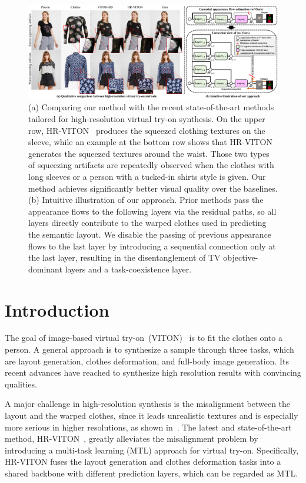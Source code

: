 \documentclass[letterpaper]{article} %
\begin{document}
\begin{figure}[t!]
    \centering
     \includegraphics[width=\linewidth]{fig/fig1.pdf}
     \caption{
     (a) Comparing our method with the recent state-of-the-art methods tailored for high-resolution virtual try-on synthesis. On the upper row, HR-VITON~\cite{lee2022hrviton} produces the squeezed clothing textures on the sleeve, while an example at the bottom row shows that HR-VITON generates the squeezed textures around the waist. Those two types of squeezing artifacts are repeatedly observed when the clothes with long sleeves or a person with a tucked-in shirts style is given. Our method achieves significantly better visual quality over the baselines. (b) Intuitive illustration of our approach. Prior methods pass the appearance flows to the following layers via the residual paths, so all layers directly contribute to the warped clothes used in predicting the semantic layout. We disable the passing of previous appearance flows to the last layer by introducing a sequential connection only at the last layer, resulting in the disentanglement of TV objective-dominant layers and a task-coexistence layer.
     }
     \label{fig_intro_res}
\end{figure}

\section{Introduction}
\label{sec_intro}

The goal of image-based virtual try-on~(VITON)~\cite{han2018viton} is to fit the clothes onto a person.
A general approach is to synthesize a sample through three tasks, which are layout generation, clothes deformation, and full-body image generation.
Its recent advances have reached to synthesize high resolution results with convincing qualities.

A major challenge in high-resolution synthesis is the misalignment between the layout and the warped clothes, since it leads unrealistic textures and is especially more serious in higher resolutions, as shown in~\cite{choi2021viton}.
The latest and state-of-the-art method, HR-VITON~\cite{lee2022hrviton}, greatly alleviates the misalignment problem by introducing a multi-task learning (MTL) approach for virtual try-on. 
Specifically, HR-VITON fuses the layout generation and clothes deformation tasks into a shared backbone with different prediction layers, which can be regarded as MTL.
\end{document}
